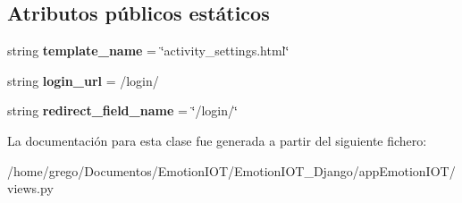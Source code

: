 \subsection*{Atributos públicos estáticos}
\begin{DoxyCompactItemize}
\item 
string {\bfseries template\+\_\+name} = \char`\"{}activity\+\_\+settings.\+html\char`\"{}\hypertarget{classappEmotionIOT_1_1views_1_1Activity__settings_a20df105aab0e5cf04f34ffdda3019699}{}\label{classappEmotionIOT_1_1views_1_1Activity__settings_a20df105aab0e5cf04f34ffdda3019699}

\item 
string {\bfseries login\+\_\+url} = \textquotesingle{}/login/\textquotesingle{}\hypertarget{classappEmotionIOT_1_1views_1_1Activity__settings_a666c28ab016122df0349ec7d17e2789f}{}\label{classappEmotionIOT_1_1views_1_1Activity__settings_a666c28ab016122df0349ec7d17e2789f}

\item 
string {\bfseries redirect\+\_\+field\+\_\+name} = \char`\"{}/login/\char`\"{}\hypertarget{classappEmotionIOT_1_1views_1_1Activity__settings_a39e1605c89c4865ca9ede955f763e57b}{}\label{classappEmotionIOT_1_1views_1_1Activity__settings_a39e1605c89c4865ca9ede955f763e57b}

\end{DoxyCompactItemize}


La documentación para esta clase fue generada a partir del siguiente fichero\+:\begin{DoxyCompactItemize}
\item 
/home/grego/\+Documentos/\+Emotion\+I\+O\+T/\+Emotion\+I\+O\+T\+\_\+\+Django/app\+Emotion\+I\+O\+T/views.\+py\end{DoxyCompactItemize}
